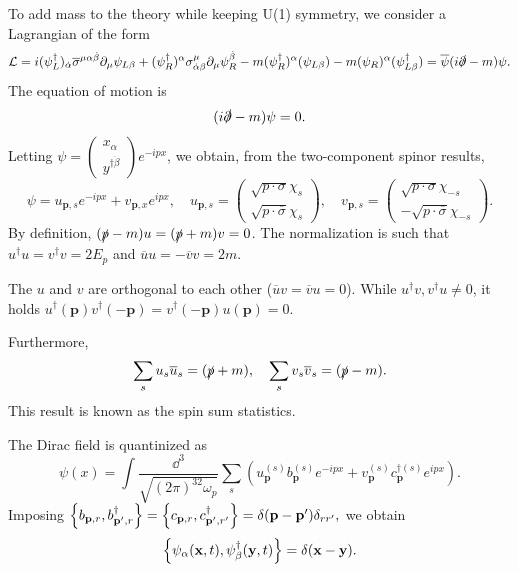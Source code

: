 \documentclass{article}
\begin{document}
To add mass to the theory while keeping U(1) symmetry, we consider a Lagrangian of the form 
\begin{equation}
    \mathcal L=i(\psi^\dag_L)_{\dot\alpha}\overline\sigma^{\mu\alpha\dot\beta}\partial_\mu\psi_{L\beta}+(\psi^\dag_R)^\alpha\sigma^\mu_{\dot\alpha\beta}\partial_\mu\psi^{\dot\beta}_R-m(\psi^\dag_R)^\alpha(\psi_{L\beta})-m(\psi_R)^\alpha(\psi^\dag_{L\beta})=\overline\psi(i\slashed\partial-m)\psi.
\end{equation}
The equation of motion is 
\begin{equation}
    (i\slashed\partial-m)\psi=0.
\end{equation}
Letting $\psi=\begin{pmatrix}x_\alpha\\y^{\dag\dot\beta}\end{pmatrix}e^{-ipx}$, we obtain, from the two-component spinor results, 
\begin{equation}
    \psi=u_{\mathbf p,s}e^{-ipx}+v_{\mathbf p,x}e^{ipx},\quad u_{\mathbf p,s}=\begin{pmatrix}\sqrt{p\cdot\sigma}\chi_s\\\sqrt{p\cdot\overline\sigma}\chi_s\end{pmatrix},\quad v_{\mathbf p,s}=\begin{pmatrix}\sqrt{p\cdot\sigma}\chi_{-s}\\-\sqrt{p\cdot\overline\sigma}\chi_{-s}\end{pmatrix}.
\end{equation}
By definition, $(\slashed p-m)u=(\slashed p+m)v=0$. The normalization is such that $u^\dag u=v^\dag v=2E_p$ and $\overline uu=-\overline vv=2m$. 

The $u$ and $v$ are orthogonal to each other ($\overline uv=\overline vu=0$). While $u^\dag v,v^\dag u\ne 0$, it holds $u^\dag(\mathbf p)v^\dag(-\mathbf p)=v^\dag(-\mathbf p)u(\mathbf p)=0$.

Furthermore, 
\begin{equation}
    \sum_su_s\overline u_s=(\slashed p+m),\quad\sum_sv_s\overline v_s=(\slashed p-m).
\end{equation}
This result is known as the spin sum statistics.

The Dirac field is quantinized as 
\begin{equation}
    \psi(x)=\int\frac{\dd^3}{\sqrt{(2\pi)^32\omega_p}}\sum_s\left(u^{(s)}_{\mathbf p}b^{(s)}_{\mathbf p}e^{-ipx}+v^{(s)}_{\mathbf p}c^{\dag(s)}_{\mathbf p}e^{ipx}\right).
\end{equation}
Imposing $\acomm{b_{\mathbf p,r}}{b^\dag_{\mathbf p',r}}=\acomm{c_{\mathbf p,r}}{c^\dag_{\mathbf p',r'}}=\delta(\mathbf p-\mathbf p')\delta_{rr'},$ we obtain
\begin{equation}
    \acomm{\psi_\alpha(\mathbf x,t)}{\psi^\dag_\beta(\mathbf y,t)}=\delta(\mathbf x-\mathbf y).
\end{equation}
\end{document}
